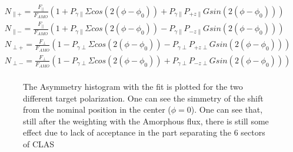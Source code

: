\begin{eqnarray}
N_{\parallel +} = \frac{F_{\parallel}}{F_{AMO}} \left( 1 + P_{\gamma \parallel}\Sigma cos(2(\phi-\phi_0)) + P_{\gamma \parallel} P_{+z\parallel} G sin(2(\phi-\phi_0)) \right) \label{eq:N1}\\
N_{\parallel -} = \frac{F_{\parallel}}{F_{AMO}} \left( 1 + P_{\gamma \parallel}\Sigma cos(2(\phi-\phi_0)) - P_{\gamma \parallel} P_{-z\parallel} G sin(2(\phi-\phi_0)) \right) \label{eq:N2}\\
N_{\perp +} = \frac{F_{\perp}}{F_{AMO}} \left( 1 - P_{\gamma \perp}\Sigma cos(2(\phi-\phi_0)) - P_{\gamma \perp} P_{+z\perp} G sin(2(\phi-\phi_0)) \right) \label{eq:N3}\\
N_{\perp -} = \frac{F_{\perp}}{F_{AMO}} \left( 1 - P_{\gamma \perp}\Sigma cos(2(\phi-\phi_0)) + P_{\gamma \perp} P_{-z\perp} G sin(2(\phi-\phi_0)) \right) \label{eq:N4}\\
\end{eqnarray}
\begin{figure}[htb]
  \begin{center}
    \caption{The Asymmetry histogram with the fit is plotted for the two different target polarization. One can see the simmetry of the shift from the nominal position in the center ($\phi = 0$).  One can see that, still after the weighting with the Amorphous flux, there is still some effect due to lack of acceptance in the part separating the 6 sectors of CLAS}
  \end{center}
\end{figure}

